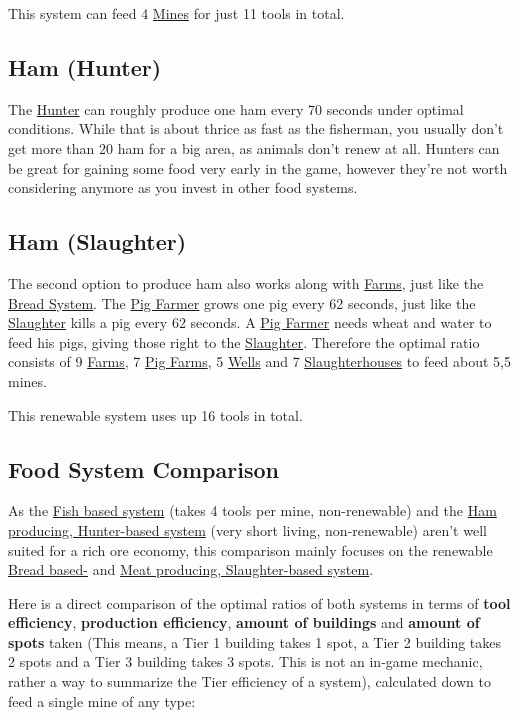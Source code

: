 \documentclass[12pt]{article}
\begin{document}
This system can feed 4 \hyperref[sec:mine]{Mines} for just 11 tools in total.

\subsection{Ham (Hunter)}
\label{sec:hamhunter}

The  \hyperref[sec:hunter]{Hunter} can roughly produce one ham every 70 seconds under optimal conditions. While that is about thrice as fast as the fisherman, you usually don't get more than 20 ham for a big area, as animals don't renew at all. Hunters can be great for gaining some food very early in the game, however they're not worth considering anymore as you invest in other food systems.

\subsection{Ham (Slaughter)}
\label{sec:hamslaughter}

The second option to produce ham also works along with \hyperref[sec:farm]{Farms}, just like the \hyperref[sec:bread]{Bread System}. The \hyperref[sec:pigfarm]{Pig Farmer} grows one pig every 62 seconds, just like the \hyperref[sec:slaughterhouse]{Slaughter} kills a pig every 62 seconds. A \hyperref[sec:pigfarm]{Pig Farmer} needs wheat and water to feed his pigs, giving those right to the \hyperref[sec:slaughterhouse]{Slaughter}. Therefore the optimal ratio consists of 9 \hyperref[sec:farm]{Farms}, 7 \hyperref[sec:pigfarm]{Pig Farms}, 5 \hyperref[sec:well]{Wells} and 7 \hyperref[sec:slaughterhouse]{Slaughterhouses} to feed about 5,5 mines.

This renewable system uses up 16 tools in total.

\subsection{Food System Comparison}
\label{sec:foodsystemcomparison}

As the \hyperref[sec:fish]{Fish based system} (takes 4 tools per mine, non-renewable) and the \hyperref[sec:hamhunter]{Ham producing, Hunter-based system} (very short living, non-renewable) aren't well suited for a rich ore economy, this comparison mainly focuses on the renewable \hyperref[sec:bread]{Bread based-} and \hyperref[sec:hamslaughter]{Meat producing, Slaughter-based system}.

Here is a direct comparison of the optimal ratios of both systems in terms of \textbf{tool efficiency}, \textbf{production efficiency}, \textbf{amount of buildings} and \textbf{amount of spots} taken (This means, a Tier 1 building takes 1 spot, a Tier 2 building takes 2 spots and a Tier 3 building takes 3 spots. This is not an in-game mechanic, rather a way to summarize the Tier efficiency of a system), calculated down to feed a single mine of any type:
\end{document}
